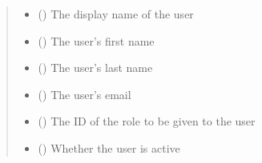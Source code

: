 \documentclass[letterpaper,10pt,english]{sphinxmanual}
\begin{document}
\begin{fulllineitems}
\begin{fulllineitems}
\begin{sphinxVerbatim}[commandchars=\\\{\}]
 
  
\end{sphinxVerbatim}
\begin{quote}\begin{description}
\begin{itemize}
\item {} 
\sphinxAtStartPar
{} () \textendash{} The display name of the user

\item {} 
\sphinxAtStartPar
{} () \textendash{} The user’s first name

\item {} 
\sphinxAtStartPar
{} () \textendash{} The user’s last name

\item {} 
\sphinxAtStartPar
{} () \textendash{} The user’s email

\item {} 
\sphinxAtStartPar
{} () \textendash{} The ID of the role to be given to the user

\item {} 
\sphinxAtStartPar
{} (\sphinxstyleliteralemphasis{\sphinxupquote{ (}}\sphinxstyleliteralemphasis{\sphinxupquote{)}}) \textendash{} Whether the user is active


\end{itemize}
\end{description}
\end{quote}
\end{fulllineitems}
\end{fulllineitems}
\end{document}
